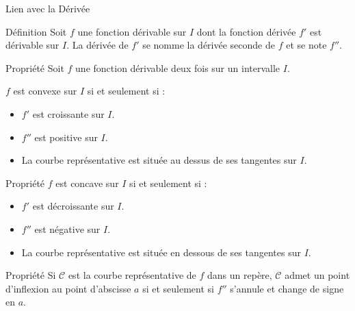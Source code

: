 \documentclass{coursbook}
\begin{document}
    \begin{Gpartie}{Lien avec la Dérivée} 
        \begin{Spartie}{Définition} 
            Soit $f$ une fonction dérivable sur $I$ dont la fonction dérivée $f'$ est dérivable sur $I$. La dérivée de $f'$ se nomme la dérivée seconde de $f$ et se note $f''$.
        \end{Spartie}
        \begin{Spartie}{Propriété} 
            Soit $f$ une fonction dérivable deux fois sur un intervalle $I$.

            $f$ est convexe sur $I$ si et seulement si :
            \begin{itemize}
                \item $f'$ est croissante sur $I$.
                \item $f''$ est positive sur $I$.
                \item La courbe représentative est située au dessus de ses tangentes sur $I$.
            \end{itemize}
        \end{Spartie}
        \begin{Spartie}{Propriété} 
            $f$ est concave sur $I$ si et seulement si :
            \begin{itemize}
                \item $f'$ est décroissante sur $I$.
                \item $f''$ est négative sur $I$.
                \item La courbe représentative est située en dessous de ses tangentes sur $I$.
            \end{itemize}
        \end{Spartie}
        \begin{Spartie}{Propriété} 
            Si $\mathcal{C}$ est la courbe représentative de $f$ dans un repère, $\mathcal{C}$ admet un point d'inflexion au point d'abscisse $a$ si et seulement si $f''$ s'annule et change de signe en $a$.


\end{Spartie}
\end{Gpartie}
\end{document}
